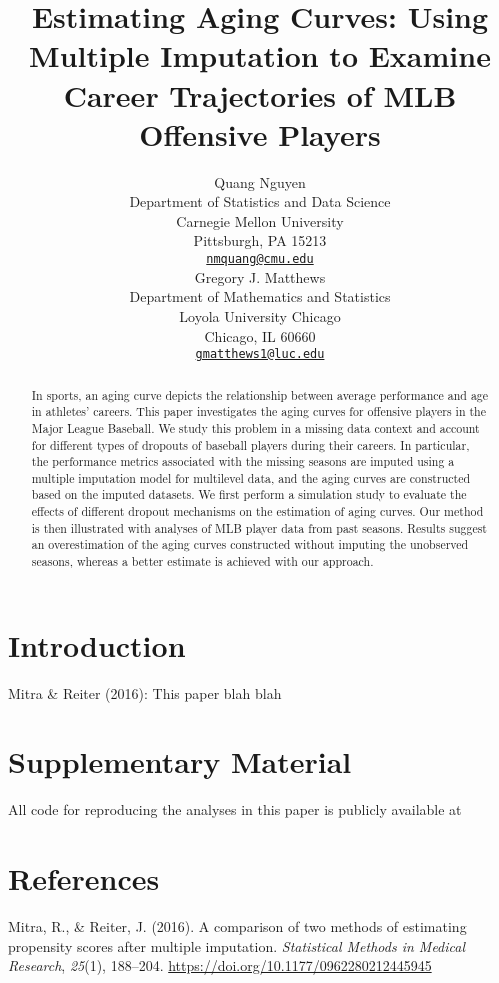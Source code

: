 \documentclass{article}
\title{\textbf{Estimating Aging Curves: Using Multiple Imputation to Examine Career Trajectories of MLB Offensive Players}}
\author{
    Quang Nguyen
   \\
    Department of Statistics and Data Science \\
    Carnegie Mellon University \\
  Pittsburgh, PA 15213 \\
  \texttt{\href{mailto:nmquang@cmu.edu}{\nolinkurl{nmquang@cmu.edu}}} \\
   \And
    Gregory J. Matthews
   \\
    Department of Mathematics and Statistics \\
    Loyola University Chicago \\
  Chicago, IL 60660 \\
  \texttt{\href{mailto:gmatthews1@luc.edu}{\nolinkurl{gmatthews1@luc.edu}}} \\
  }
\newlength{\cslhangindent}
\newlength{\cslentryspacingunit} %
\newenvironment{CSLReferences}[2] %
 {%
  \setlength{\parindent}{0pt}
  \ifodd #1
  \let\oldpar\par
  \def\par{\hangindent=\cslhangindent\oldpar}
  \fi
  \setlength{\parskip}{#2\cslentryspacingunit}
 }%
 {}
\begin{document}
\maketitle


\begin{abstract}
In sports, an aging curve depicts the relationship between average
performance and age in athletes' careers. This paper investigates the
aging curves for offensive players in the Major League Baseball. We
study this problem in a missing data context and account for different
types of dropouts of baseball players during their careers. In
particular, the performance metrics associated with the missing seasons
are imputed using a multiple imputation model for multilevel data, and
the aging curves are constructed based on the imputed datasets. We first
perform a simulation study to evaluate the effects of different dropout
mechanisms on the estimation of aging curves. Our method is then
illustrated with analyses of MLB player data from past seasons. Results
suggest an overestimation of the aging curves constructed without
imputing the unobserved seasons, whereas a better estimate is achieved
with our approach.
\end{abstract}


\hypertarget{sec:intro}{%
\section{Introduction}\label{sec:intro}}

Mitra \& Reiter (2016): This paper blah blah

\hypertarget{supplementary-material}{%
\section*{Supplementary Material}\label{supplementary-material}}

All code for reproducing the analyses in this paper is publicly
available at

\hypertarget{references}{%
\section*{References}\label{references}}

\hypertarget{refs}{}
\begin{CSLReferences}{1}{0}
\leavevmode{}%
Mitra, R., \& Reiter, J. (2016). A comparison of two methods of
estimating propensity scores after multiple imputation.
\emph{Statistical Methods in Medical Research}, \emph{25}(1), 188--204.
\url{https://doi.org/10.1177/0962280212445945}

\end{CSLReferences}



\end{document}
